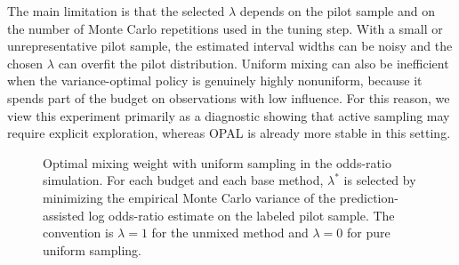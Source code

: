 The main limitation is that the selected \(\lambda\) depends on the pilot sample and on the number of Monte Carlo repetitions used in the tuning step.  With a small or unrepresentative pilot sample, the estimated interval widths can be noisy and the chosen \(\lambda\) can overfit the pilot distribution.  Uniform mixing can also be inefficient when the variance-optimal policy is genuinely highly nonuniform, because it spends part of the budget on observations with low influence.  For this reason, we view this experiment primarily as a diagnostic showing that active sampling may require explicit exploration, whereas OPAL is already more stable in this setting.

\begin{figure}[t]
    \centering
    \caption{Optimal mixing weight with uniform sampling in the odds-ratio simulation.  For each budget and each base method, \(\lambda^*\) is selected by minimizing the empirical Monte Carlo variance of the prediction-assisted log odds-ratio estimate on the labeled pilot sample.  The convention is \(\lambda=1\) for the unmixed method and \(\lambda=0\) for pure uniform sampling.}
    \label{fig:sim-lambdatune}
\end{figure}
